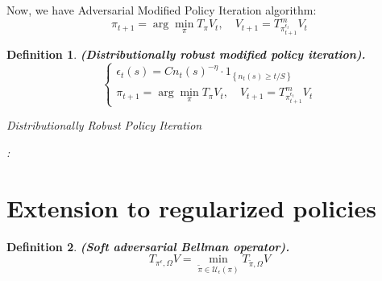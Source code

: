 \documentclass[a4paper]{article}
\newtheorem{definition}{Definition}
\begin{document}
Now, we have Adversarial Modified Policy Iteration algorithm:
\[
    \pi_{t+1} = \arg\min_{\pi} T_{\pi} V_t, \quad V_{t+1} = T^{m}_{\pi^{\epsilon_t}_{t+1}} V_t
\]

\begin{definition}
    \textbf{(Distributionally robust modified policy iteration).}
    \[
        \begin{cases}
            \epsilon_t(s) = C {n_{t}(s)}^{-\eta} \cdot 1_{\left\{ n_t(s) \ge t/S \right\}}\\
            \pi_{t+1} = \arg\min_{\pi} T_{\pi} V_t, \quad V_{t+1} = T^{m}_{\pi^{\epsilon_t}_{t+1}} V_t
        \end{cases}
    \]
    \begin{algorithm}[H]
        \caption{Distributionally Robust Policy Iteration}
        \begin{algorithmic}
            \Repeat:
        \end{algorithmic}
    \end{algorithm}
\end{definition}

\section{Extension to regularized policies}%

\begin{definition}
    \textbf{(Soft adversarial Bellman operator).}
    \[
        T_{\pi^{\epsilon},\Omega} V = \min_{\tilde \pi \in \mathcal{U}_{\epsilon}(\pi)}T_{\tilde \pi, \Omega}V
    \]
\end{definition}
\end{document}
